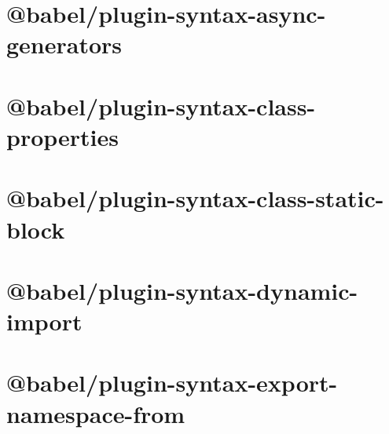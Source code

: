 \documentclass[twoside]{book}
\newcommand{\+}{\discretionary{\mbox{\scriptsize$\hookleftarrow$}}{}{}}
\begin{document}
\chapter{@babel/plugin-\/syntax-\/async-\/generators}
\label{md__c___users_vaishnavi_jadhav__desktop__developer_code_mean_stack_example_client_node_modules__4b75ae9baffe631ef057ab9ba8714ef8}

\chapter{@babel/plugin-\/syntax-\/class-\/properties}
\label{md__c___users_vaishnavi_jadhav__desktop__developer_code_mean_stack_example_client_node_modules__92bca309558ca81a8f96c954813fc202}

\chapter{@babel/plugin-\/syntax-\/class-\/static-\/block}
\label{md__c___users_vaishnavi_jadhav__desktop__developer_code_mean_stack_example_client_node_modules__edc03a39e7062d600dc4ffc4beda9766}

\chapter{@babel/plugin-\/syntax-\/dynamic-\/import}
\label{md__c___users_vaishnavi_jadhav__desktop__developer_code_mean_stack_example_client_node_modules__53c5b091435c716cd292769736642985}

\chapter{@babel/plugin-\/syntax-\/export-\/namespace-\/from}
\label{md__c___users_vaishnavi_jadhav__desktop__developer_code_mean_stack_example_client_node_modules__b1bdd1f677ed62a77d78cc1f047fb94d}

\end{document}
